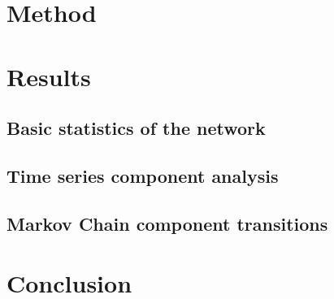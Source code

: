 \documentclass{Resources/netsci-project}
\begin{document}
\section{Method}

\section{Results}

\subsection{Basic statistics of the network}

\subsection{Time series component analysis}

\subsection{Markov Chain component transitions}

\section{Conclusion}

\printbibliography
\end{document}
